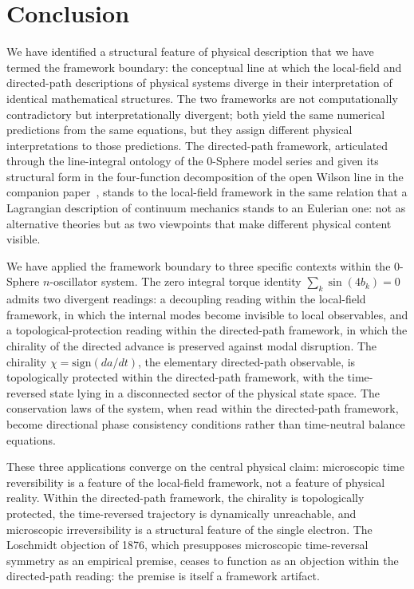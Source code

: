 \documentclass[%
 reprint, amsmath,amssymb, aps, prb, ]{revtex4-2}
\numberwithin{equation}{section}
\begin{document}
\section{Conclusion}
\label{sec:conclusion}

We have identified a structural feature of physical description that we have termed the framework boundary: the conceptual line at which the local-field and directed-path descriptions of physical systems diverge in their interpretation of identical mathematical structures. The two frameworks are not computationally contradictory but interpretationally divergent; both yield the same numerical predictions from the same equations, but they assign different physical interpretations to those predictions. The directed-path framework, articulated through the line-integral ontology of the 0-Sphere model series and given its structural form in the four-function decomposition of the open Wilson line in the companion paper~\cite{hanamura55}, stands to the local-field framework in the same relation that a Lagrangian description of continuum mechanics stands to an Eulerian one: not as alternative theories but as two viewpoints that make different physical content visible.

We have applied the framework boundary to three specific contexts within the 0-Sphere $n$-oscillator system. The zero integral torque identity $\sum_k \sin(4 b_k) = 0$ admits two divergent readings: a decoupling reading within the local-field framework, in which the internal modes become invisible to local observables, and a topological-protection reading within the directed-path framework, in which the chirality of the directed advance is preserved against modal disruption. The chirality $\chi = \mathrm{sign}(da/dt)$, the elementary directed-path observable, is topologically protected within the directed-path framework, with the time-reversed state lying in a disconnected sector of the physical state space. The conservation laws of the system, when read within the directed-path framework, become directional phase consistency conditions rather than time-neutral balance equations.

These three applications converge on the central physical claim: microscopic time reversibility is a feature of the local-field framework, not a feature of physical reality. Within the directed-path framework, the chirality is topologically protected, the time-reversed trajectory is dynamically unreachable, and microscopic irreversibility is a structural feature of the single electron. The Loschmidt objection of 1876, which presupposes microscopic time-reversal symmetry as an empirical premise, ceases to function as an objection within the directed-path reading: the premise is itself a framework artifact.
\end{document}
